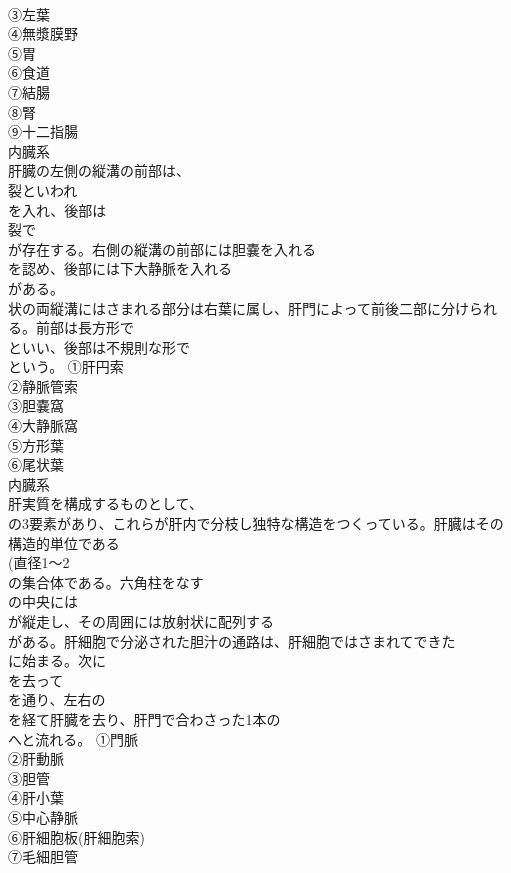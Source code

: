 \documentclass[8pt]{extreport}
\begin{document}
\begin{CJK}{UTF8}{min}
\\	③左葉
\\	④無漿膜野
\\	⑤胃
\\	⑥食道
\\	⑦結腸
\\	⑧腎
\\	⑨十二指腸
\\	内臓系
\\	肝臓の左側の縦溝の前部は、
\\	裂といわれ
\\	を入れ、後部は
\\	裂で
\\	が存在する。右側の縦溝の前部には胆嚢を入れる
\\	を認め、後部には下大静脈を入れる
\\	がある。
\\	状の両縦溝にはさまれる部分は右葉に属し、肝門によって前後二部に分けられる。前部は長方形で
\\	といい、後部は不規則な形で
\\	という。	①肝円索
\\	②静脈管索
\\	③胆嚢窩
\\	④大静脈窩
\\	⑤方形葉
\\	⑥尾状葉
\\	内臓系
\\	肝実質を構成するものとして、
\\	の3要素があり、これらが肝内で分枝し独特な構造をつくっている。肝臓はその構造的単位である
\\	(直径1～2
\\	の集合体である。六角柱をなす
\\	の中央には
\\	が縦走し、その周囲には放射状に配列する
\\	がある。肝細胞で分泌された胆汁の通路は、肝細胞ではさまれてできた
\\	に始まる。次に
\\	を去って
\\	を通り、左右の
\\	を経て肝臓を去り、肝門で合わさった1本の
\\	へと流れる。	①門脈
\\	②肝動脈
\\	③胆管
\\	④肝小葉
\\	⑤中心静脈
\\	⑥肝細胞板(肝細胞索)
\\	⑦毛細胆管

\end{CJK}
\end{document}
